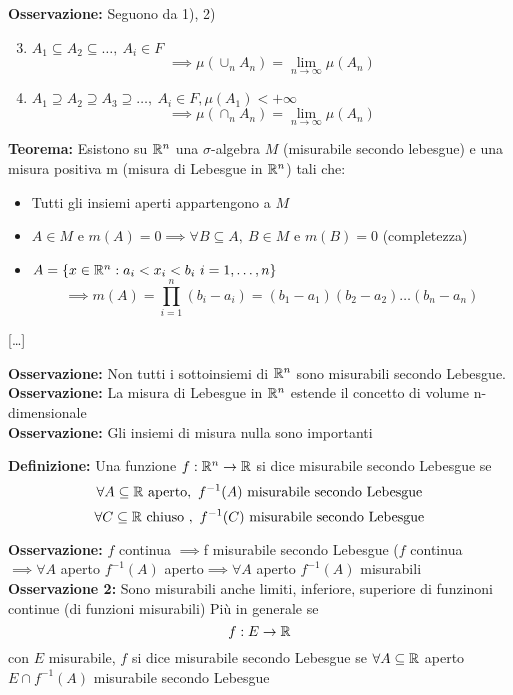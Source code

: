 \textbf{Osservazione:} Seguono da 1), 2)
\begin{enumerate}
\setcounter{enumi}{2}
	\item $A_1\subseteq A_2\subseteq \ldots,\ A_i\in F$\[\implies \mu(\cup_n A_n)=\lim_{n \to \infty} \mu(A_n)\]
	\item $A_1 \supseteq A_2\supseteq A_3\supseteq \ldots, \ A_i\in F,\mu (A_1)<+\infty$\[\implies\mu( \cap_n A_n)=\lim_{n \to \infty}\mu(A_n)\] 
\end{enumerate}
\begin{tcolorbox}
	\textbf{Teorema:} Esistono su $\mathbb{R}^n$ una $\sigma$-algebra $M$ (misurabile secondo lebesgue) e una misura positiva m (misura di Lebesgue in $\mathbb{R}^n$) tali che:
	\begin{itemize}
		\item Tutti gli insiemi aperti appartengono a $M$
		\item $A\in M$ e $m(A)=0\implies\forall B\subseteq A,\ B\in M \text{ e } m(B)=0$ (completezza)
		\item $A=\{x\in \R^n: a_i<x_i<b_i\ i=1,\ldots,n\}$\[\implies m(A)=\prod_{i=1}^n(b_i-a_i)=(b_1-a_1)(b_2-a_2)\ldots(b_n-a_n)\]
	\end{itemize}
	[\ldots] 
\end{tcolorbox}
\textbf{Osservazione: }Non tutti i sottoinsiemi di $\mathbb{R}^n$ sono misurabili secondo Lebesgue.
\\\textbf{Osservazione: }La misura di Lebesgue in $\mathbb{R}^n$ estende il concetto di volume n-dimensionale
\\\textbf{Osservazione:} Gli insiemi di misura nulla sono importanti 
\begin{tcolorbox}
	\textbf{Definizione:} Una funzione $f:\mathbb{R}^n\to \mathbb{R}$ si dice misurabile secondo Lebesgue se
	\[\forall A\subseteq \mathbb{R} \text{ aperto},\ f^{-1}(A) \text{ misurabile secondo Lebesgue}\]
	\[\forall C\subseteq\R\text{ chiuso }, \ f^{-1}(C)\text{ misurabile secondo Lebesgue}\]
\end{tcolorbox}
\textbf{Osservazione:} $f$ continua $\implies$f misurabile secondo Lebesgue ($f$ continua $\implies\forall A$ aperto $f^{-1}(A)$ aperto$\implies \forall  A$ aperto $f^{-1}(A)$ misurabili
\\\textbf{Osservazione 2:} Sono misurabili anche limiti, inferiore, superiore di funzinoni continue (di funzioni misurabili)\bigbreak
Più in generale se 
\[f: E\to \mathbb{R}\] con $E$ misurabile, $f$ si dice misurabile secondo Lebesgue se $\forall  A\subseteq\mathbb{R}$ aperto $E\cap f^{-1}(A)$ misurabile secondo Lebesgue
